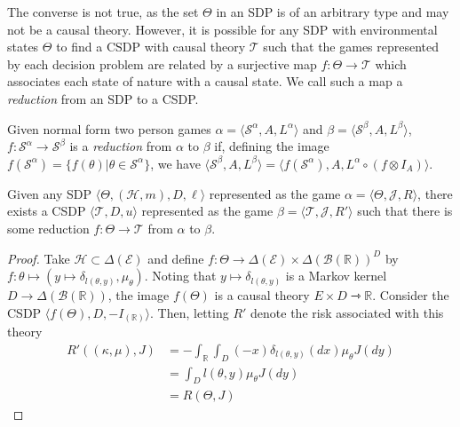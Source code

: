 {The converse is not true, as the set $\Theta$ in an SDP is of an arbitrary type and may not be a causal theory. However, it is possible for any SDP with environmental states $\Theta$ to find a CSDP with causal theory $\mathscr{T}$ such that the games represented by each decision problem are related by a surjective map $f:\Theta\to \mathscr{T}$ which associates each state of nature with a causal state. We call such a map a \emph{reduction} from an SDP to a CSDP.

\begin{definition}[Reduction]\label{def:red_sdp_CSDP}
Given normal form two person games $\alpha = \langle \mathscr{S}^\alpha, A, L^\alpha\rangle$ and $\beta = \langle \mathscr{S}^\beta, A, L^\beta \rangle$, $f:\mathscr{S}^\alpha\to \mathscr{S}^\beta$ is a \emph{reduction} from $\alpha$ to $\beta$ if, defining the image $f(\mathscr{S}^\alpha)=\{f(\theta)|\theta\in \mathscr{S}^\alpha\}$, we have $\langle \mathscr{S}^\beta, A, L^\beta \rangle = \langle f(\mathscr{S}^\alpha), A, L^\alpha\circ(f\otimes I_A)\rangle$.
\end{definition}

\begin{theorem}\label{th:csdps_represent_sdps}
Given any SDP $\langle \Theta, (\mathscr{H},m), D, \ell\rangle$ represented as the game $\alpha = \langle \Theta, \mathscr{J},R\rangle$, there exists a CSDP $\langle \mathscr{T},D,u\rangle$ represented as the game $\beta=\langle\mathscr{T},\mathscr{J},R' \rangle$ such that there is some reduction $f:\Theta\to \mathscr{T}$ from $\alpha$ to $\beta$.
\end{theorem} 

\begin{proof}
Take $\mathscr{H}\subset\Delta(\mathcal{E})$ and define $f:\Theta\to \Delta(\mathcal{E})\times \Delta(\mathcal{B}(\mathbb{R}))^D$ by $f:\theta\mapsto (y\mapsto \delta_{l(\theta,y)},\mu_\theta)$. Noting that $y\mapsto \delta_{l(\theta,y)}$ is a Markov kernel $D\to \Delta(\mathcal{B}(\mathbb{R}))$, the image $f(\Theta)$ is a causal theory $E\times D\rightarrowtriangle \mathbb{R}$. Consider the CSDP $\langle f(\Theta),D,-I_{(\mathbb{R})}\rangle$. Then, letting $R'$ denote the risk associated with this theory
\begin{align}
 R'((\kappa,\mu),J) &= -\int_\mathbb{R} \int_D (-x) \delta_{l(\theta,y)}(dx) \mu_\theta J(dy)\\
 					&= \int_D l(\theta,y) \mu_\theta J(dy)\\
 					&= R(\Theta,J)
\end{align}
\end{proof}

}
